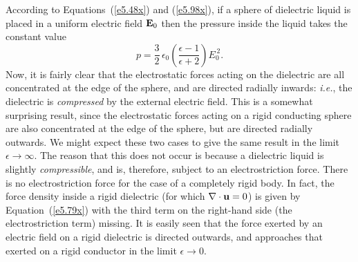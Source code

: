 According to Equations~(\ref{e5.48x}) and (\ref{e5.98x}), if a sphere of  dielectric
liquid is placed in a uniform electric field ${\bf E}_0$ then the
pressure inside the liquid  takes the constant value
\begin{equation}
p = \frac{3}{2}\, \epsilon_0 \left(\frac{\epsilon-1}{\epsilon + 2}\right) E_0^{\,2}.
\end{equation}
Now, it is fairly clear that the electrostatic
forces acting on the dielectric  are all concentrated at the
edge of the sphere, and are directed radially inwards: {\em i.e.}, the
dielectric is {\em compressed}\/ by the external electric field. This
is a somewhat surprising result, since the electrostatic forces acting on
a rigid conducting sphere are also concentrated at the edge of the sphere, but
are directed radially outwards. We might expect these two cases to give the
same result in the limit $\epsilon\rightarrow \infty$. 
The reason that this does not occur is 
because a dielectric liquid is 
 slightly {\em compressible},
and is,  therefore, subject to an electrostriction force. There is no
electrostriction force for the case of a completely rigid body. 
In fact, the force
density inside a rigid dielectric (for which $\nabla \cdot {\bf u} =0$)
is given by Equation~(\ref{e5.79x}) with the third term on the right-hand side (the electrostriction term)
missing. It is easily seen that the force exerted by an electric
field on a rigid dielectric is directed outwards, and approaches that exerted
on a rigid conductor in the limit $\epsilon\rightarrow 0$.

